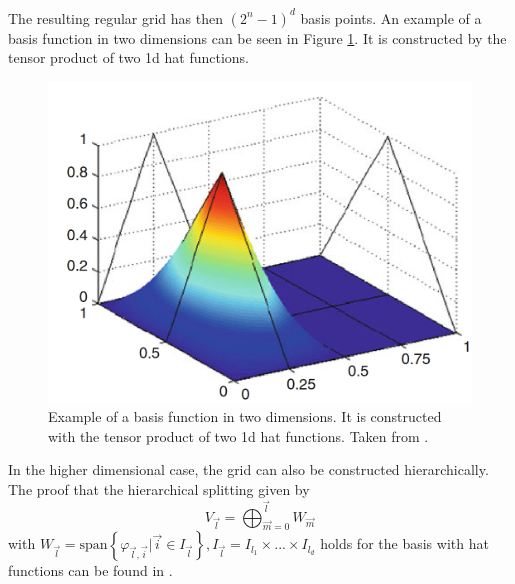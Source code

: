 The resulting regular grid has then $ (2^n - 1)^d $ basis points. An example of a basis function in two dimensions can be seen in Figure \ref{fig:2d_basis}. It is constructed by the tensor product of two 1d hat functions. 

\begin{figure}[ht]
	\centering
	\includegraphics[scale=0.26]{figures/2d_basis.png}
	\caption{ Example of a basis function in two dimensions. It is constructed with the tensor product of two 1d hat functions. Taken from \cite{garcke2013sparse}. }
	\label{fig:2d_basis}
\end{figure}

In the higher dimensional case, the grid can also be constructed hierarchically. The proof that the hierarchical splitting given by 
\begin{equation}
	V_{\vec{l}} = \bigoplus_{\vec{m} = 0}^{\vec{l}} W_{\vec{m}}
\end{equation}
with $ W_{\vec{l}} = \text{span}\left\{\varphi_{\vec{l}, \vec{i}} | \vec{i} \in I_{\vec{l}}\right\}, I_{\vec{l}} = I_{l_1} \times ... \times I_{l_d} $ holds for the basis with hat functions can be found in \cite{b_splines}.

